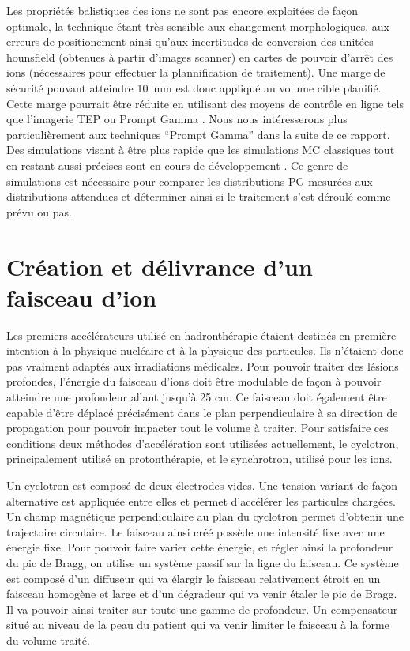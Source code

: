 \documentclass[11pt,a4paper,oldfontcommands]{memoir}
\begin{document}
Les propriétés balistiques des ions ne sont pas encore exploitées de façon optimale, la technique étant très sensible aux changement morphologiques, aux erreurs de positionement ainsi qu'aux incertitudes de conversion des unitées hounsfield (obtenues à partir d'images scanner) en cartes de pouvoir d'arrêt des ions (nécessaires pour effectuer la plannification de traitement)\cite{Paganetti2012}. Une marge de sécurité pouvant atteindre 10~mm est donc appliqué au volume cible planifié. Cette marge pourrait être réduite en utilisant des moyens de contrôle en ligne tels que l'imagerie TEP \cite{Parodi20157153} ou Prompt Gamma \cite{PGMonitoringC12}. Nous nous intéresserons plus particulièrement aux techniques \enquote{Prompt Gamma} dans la suite de ce rapport. \\
Des simulations visant à être plus rapide que les simulations MC classiques tout en restant aussi précises sont en cours de développement \cite{Huisman_2016}\cite{Embriaco_2018}\cite{Sterpin_2015}. Ce genre de simulations est nécessaire pour comparer les distributions PG mesurées aux distributions attendues et déterminer ainsi si le traitement s'est déroulé comme prévu ou pas.

\section{Création et délivrance d'un faisceau d'ion}
Les premiers accélérateurs utilisé en hadronthérapie étaient destinés en première intention à la physique nucléaire et à la physique des particules. Ils n'étaient donc pas vraiment adaptés aux irradiations médicales. Pour pouvoir traiter des lésions profondes, l'énergie du faisceau d'ions doit être modulable de façon à pouvoir atteindre une profondeur allant jusqu'à 25 cm. Ce faisceau doit également être capable d'être déplacé précisément dans le plan perpendiculaire à sa direction de propagation pour pouvoir impacter tout le volume à traiter. Pour satisfaire ces conditions deux méthodes d'accélération sont utilisées actuellement, le cyclotron, principalement utilisé en protonthérapie, et le synchrotron, utilisé pour les ions.

Un cyclotron est composé de deux électrodes vides. Une tension variant de façon alternative est appliquée entre elles et permet d'accélérer les particules chargées. Un champ magnétique perpendiculaire au plan du cyclotron permet d'obtenir une trajectoire circulaire. Le faisceau ainsi créé possède une intensité fixe avec une énergie fixe. Pour pouvoir faire varier cette énergie, et régler ainsi la profondeur du pic de Bragg, on utilise un système passif sur la ligne du faisceau. Ce système est composé d'un diffuseur qui va élargir le faisceau relativement étroit en un faisceau homogène et large et d'un dégradeur qui va venir étaler le pic de Bragg. Il va pouvoir ainsi traiter sur toute une gamme de profondeur. Un compensateur situé au niveau de la peau du patient qui va venir limiter le faisceau à la forme du volume traité.
\end{document}
